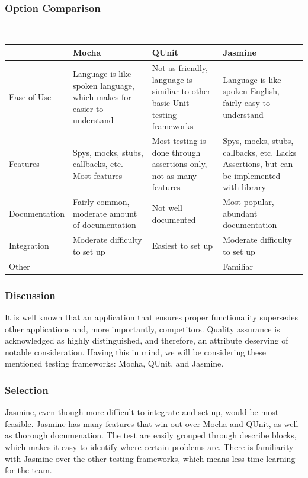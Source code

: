 \documentclass[onecolumn, draftclsnofoot,10pt, compsoc]{IEEEtran}
\begin{document}
{%

\newpage
\subsubsection{Option Comparison} ~\\
\tablehead{}
\begin{supertabular}{|p{2.5cm}|p{4.5cm}|p{4.5cm}|p{4.5cm}|}
\hline
	& Mocha
	& QUnit
	& Jasmine\\
\hline
	Ease of Use
	& Language is like spoken language, which makes for easier to understand
	& Not as friendly, language is similiar to other basic Unit testing frameworks
	& Language is like spoken English, fairly easy to understand\\
\hline
	Features
	& Spys, mocks, stubs, callbacks, etc. Most features
	& Most testing is done through assertions only, not as many features
	& Spys, mocks, stubs, callbacks, etc. Lacks Assertions, but can be implemented with library\\
\hline
	Documentation
	& Fairly common, moderate amount of documentation
	& Not well documented
	& Most popular, abundant documentation \\
\hline
	Integration
	& Moderate difficulty to set up
	& Easiest to set up
	& Moderate difficulty to set up\\
\hline
	Other
	&
	&
	& Familiar\\
\hline
\end{supertabular}

\medskip

\subsubsection{Discussion}
\noindent It is well known that an application that ensures proper functionality supersedes other applications and,
more importantly, competitors. Quality assurance is acknowledged as highly distinguished, and therefore,
an attribute deserving of notable consideration. Having this in mind, we will be considering these mentioned
testing frameworks: Mocha, QUnit, and Jasmine.


\subsubsection{Selection}
\noindent Jasmine, even though more difficult to integrate and set up, would be most feasible. Jasmine has many features that win
out over Mocha and QUnit, as well as thorough documenation. The test are easily grouped through describe blocks, which makes it easy
to identify where certain problems are. There is familiarity with Jasmine over the other testing frameworks, which means less time learning
for the team.

}
\end{document}
